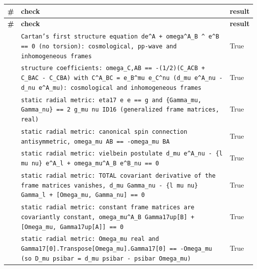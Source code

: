 \documentclass[10pt,a4paper]{article}
\begin{document}
{\footnotesize
\begin{longtable}{>{\raggedright\arraybackslash}p{}>{\raggedright\arraybackslash}p{}>{\raggedright\arraybackslash}p{}}
\toprule
\textbf{\#} & \textbf{check} & \textbf{result} \\
\midrule\endfirsthead
\toprule
\textbf{\#} & \textbf{check} & \textbf{result} \\
\midrule\endhead
\endfoot
\bottomrule\endlastfoot
273 & \texttt{Cartan's first structure equation de\textasciicircum{}A + omega\textasciicircum{}A\_\allowbreak{}B \textasciicircum{} e\textasciicircum{}B == 0 (no torsion): cosmological, pp-wave and inhomogeneous frames} & True \\
274 & \texttt{structure coefficients: omega\_\allowbreak{}C,AB == -(1/\allowbreak{}2)(C\_\allowbreak{}ACB + C\_\allowbreak{}BAC - C\_\allowbreak{}CBA) with C\textasciicircum{}A\_\allowbreak{}BC = e\_\allowbreak{}B\textasciicircum{}mu e\_\allowbreak{}C\textasciicircum{}nu (d\_\allowbreak{}mu e\textasciicircum{}A\_\allowbreak{}nu - d\_\allowbreak{}nu e\textasciicircum{}A\_\allowbreak{}mu): cosmological and inhomogeneous frames} & True \\
275 & \texttt{static radial metric: eta17 e e == g and \{Gamma\_\allowbreak{}mu, Gamma\_\allowbreak{}nu\} == 2 g\_\allowbreak{}mu nu ID16 (generalized frame matrices, real)} & True \\
276 & \texttt{static radial metric: canonical spin connection antisymmetric, omega\_\allowbreak{}mu AB == -omega\_\allowbreak{}mu BA} & True \\
277 & \texttt{static radial metric: vielbein postulate d\_\allowbreak{}mu e\textasciicircum{}A\_\allowbreak{}nu - \{l mu nu\} e\textasciicircum{}A\_\allowbreak{}l + omega\_\allowbreak{}mu\textasciicircum{}A\_\allowbreak{}B e\textasciicircum{}B\_\allowbreak{}nu == 0} & True \\
278 & \texttt{static radial metric: TOTAL covariant derivative of the frame matrices vanishes, d\_\allowbreak{}mu Gamma\_\allowbreak{}nu - \{l mu nu\} Gamma\_\allowbreak{}l + [Omega\_\allowbreak{}mu, Gamma\_\allowbreak{}nu] == 0} & True \\
279 & \texttt{static radial metric: constant frame matrices are covariantly constant, omega\_\allowbreak{}mu\textasciicircum{}A\_\allowbreak{}B Gamma17up[B] + [Omega\_\allowbreak{}mu, Gamma17up[A]] == 0} & True \\
280 & \texttt{static radial metric: Omega\_\allowbreak{}mu real and Gamma17[0].Transpose[Omega\_\allowbreak{}mu].Gamma17[0] == -Omega\_\allowbreak{}mu (so D\_\allowbreak{}mu psibar = d\_\allowbreak{}mu psibar - psibar Omega\_\allowbreak{}mu)} & True \\

\end{longtable}}
\end{document}
